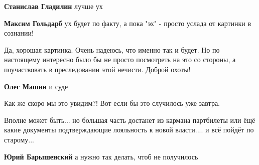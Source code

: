 \begin{itemize}
\begin{itemize}
\textbf{Станислав Гладилин} лучше ух

 
\textbf{Максим Гольдарб} ух будет по факту, а пока "эх" - просто услада от картинки в сознании!
\end{itemize}


Да, хорошая картинка. Очень надеюсь, что именно так и будет. Но по настоящему
интересно было бы не просто посмотреть на это со стороны, а поучаствовать в
преследовании этой нечисти. Доброй охоты! \Smiley[1.0][yellow]

\begin{itemize}
 
\textbf{Олег Машин} и суде
\end{itemize}


Как же скоро мы это увидим?! Вот если бы это случилось уже завтра.


Вполне может быть... но большая часть достанет из кармана партбилеты или ёщё
какие документы подтверждающие лояльность к новой власти.... и всё пойдёт по
старому...

\begin{itemize}
 
\textbf{Юрий Барышенский} а нужно так делать, чтоб не получилось
\end{itemize}


\end{itemize}
